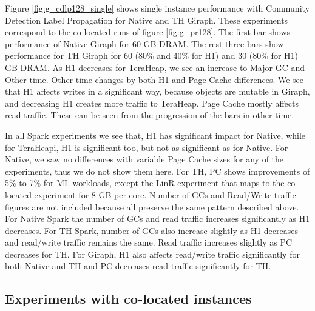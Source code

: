 Figure \ref{fig:g_cdlp128_single} shows single instance performance with Community Detection Label Propagation for Native and TH Giraph. These experiments correspond to the co-located runs of figure \ref{fig:g_pr128}. The first bar shows performance of Native Giraph for 60 GB DRAM. The rest three bars show performance for TH Giraph for 60 (80\% and 40\% for H1) and 30 (80\% for H1) GB DRAM. As H1 decreases for TeraHeap, we see an increase to Major GC  and Other time. Other time changes by both H1 and Page Cache differences. We see that H1 affects writes in a significant way, because objects are mutable in Giraph, and decreasing H1 creates more traffic to TeraHeap. Page Cache mostly affects read traffic. These can be seen from the progression of the bars in other time.

In all Spark experiments we see that, H1 has significant impact for Native, while for TeraHeapi, H1 is significant too, but not as significant as for Native. For Native, we saw no differences with variable Page Cache sizes for any of the experiments, thus we do not show them here. For TH, PC shows improvements of 5\% to 7\% for ML workloads, except the LinR experiment that maps to the co-located experiment for 8 GB per core. Number of GCs and Read/Write traffic figures are not included because all preserve the same pattern described above. For Native Spark the number of GCs and read traffic increases significantly as H1 decreases. For TH Spark, number of GCs also increase slightly as H1 decreases and read/write traffic remains the same. Read traffic increases slightly as PC decreases for TH. For Giraph, H1 also affects read/write traffic significantly for both Native and TH and PC decreases read traffic significantly for TH.

\subsection{Experiments with co-located instances}

